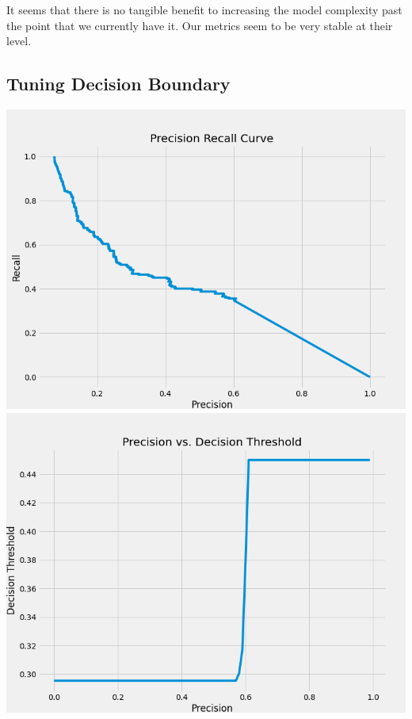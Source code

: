 \documentclass[12pt]{article}
\begin{document}
	It seems that there is no tangible benefit to increasing the model complexity past the point that we currently have it. Our metrics seem to be very stable at their level. 
	
	
	\subsection{Tuning Decision Boundary }
	
	\begin{center}
		\includegraphics[scale=0.3]{../notebooks/pr_curve_nn.png}
		\includegraphics[scale=0.3]{../notebooks/precisionvsthreshold_nn.png}
	\end{center}
	
\end{document}
